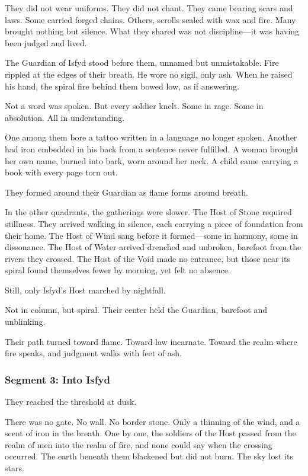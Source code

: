 \documentclass[9pt]{article}
\begin{document}
They did not wear uniforms. They did not chant. They came bearing scars and laws. Some carried forged chains. Others, scrolls sealed with wax and fire. Many brought nothing but silence. What they shared was not discipline—it was having been judged and lived.

The Guardian of Isfyd stood before them, unnamed but unmistakable. Fire rippled at the edges of their breath. He wore no sigil, only ash. When he raised his hand, the spiral fire behind them bowed low, as if answering.

Not a word was spoken. But every soldier knelt. Some in rage. Some in absolution. All in understanding.

One among them bore a tattoo written in a language no longer spoken. Another had iron embedded in his back from a sentence never fulfilled. A woman brought her own name, burned into bark, worn around her neck. A child came carrying a book with every page torn out.

They formed around their Guardian as flame forms around breath.

In the other quadrants, the gatherings were slower. The Host of Stone required stillness. They arrived walking in silence, each carrying a piece of foundation from their home. The Host of Wind sang before it formed—some in harmony, some in dissonance. The Host of Water arrived drenched and unbroken, barefoot from the rivers they crossed. The Host of the Void made no entrance, but those near its spiral found themselves fewer by morning, yet felt no absence.

Still, only Isfyd’s Host marched by nightfall.

Not in column, but spiral. Their center held the Guardian, barefoot and unblinking.

Their path turned toward flame. Toward law incarnate. Toward the realm where fire speaks, and judgment walks with feet of ash.

\newpage

\subsubsection*{Segment 3: Into Isfyd}

They reached the threshold at dusk.

There was no gate. No wall. No border stone. Only a thinning of the wind, and a scent of iron in the breath. One by one, the soldiers of the Host passed from the realm of men into the realm of fire, and none could say when the crossing occurred. The earth beneath them blackened but did not burn. The sky lost its stars.
\end{document}
